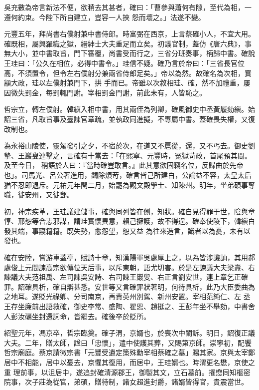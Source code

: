 \begin{pinyinscope}
 吳充數為帝言新法不便，欲稍去其甚者，確曰：「曹參與蕭何有隙，至代為相，一遵何約束。今陛下所自建立，豈容一人挾
 怨而壞之。」法遂不變。



 元豐五年，拜尚書右僕射兼中書侍郎。時富弼在西京，上言蔡確小人，不宜大用。確既相，屬興羅織之獄，縉紳士大夫重足而立矣。初議官制，蓋仿《唐六典》，事無大小，並中書取旨，門下審覆，尚書受而行之，三省分班奏事，柄歸中書。確說王珪曰：「公久在相位，必得中書令。」珪信不疑。確乃言於帝曰：「三省長官位高，不須置令，但令左右僕射分兼兩省侍郎足矣。」帝以為然。故確名為次相，實顓大政，珪以左僕射兼門下，拱
 手而已。帝雖以次敘相珪、確，然不加禮重，屢因微失罰金，每罰輒門謝。宰相罰金門謝，前此未有，人皆恥之。



 哲宗立，轉左僕射。韓縝入相中書，用其兩侄為列卿，確風御史中丞黃履劾縝。始詔三省，凡取旨事及臺諫官章疏，並執政同進擬，不專屬中書。蓋確畏失權，又復改制也。



 為永裕山陵使，靈駕發引之夕，不宿於次，在道又不扈從，還，又不丐去。御史劉摯、王巖叟連擊之，言確有十當去：「在熙寧、元豐時，冤獄苛政，首尾預其間。及至今日，
 稍語於人曰：『當時確豈敢言。』此其意欲固竊名位，反歸曲於先帝也」。司馬光、呂公著進用，蠲除煩苛，確言皆己所建白，公論益不容，太皇太后猶不忍即退斥。元祐元年閏二月，始罷為觀文殿學士、知陳州。明年，坐弟碩事奪職，徙安州，又徙鄧。



 初，神宗疾革，王珪議建儲事，確與同列皆在側，知狀。確自見得罪于世，陰與章惇、邢恕等合志邪謀，謂珪實懷異意，賴己擁護，故不得逞。確奉使陵下，韓縝白發其端，事寢籍籍。既失勢，愈怨望，恕又益
 為往來造言，識者以為憂，未有以發也。



 確在安陸，嘗游車蓋亭，賦詩十章，知漢陽軍吳處厚上之，以為皆涉譏訕，其用郝處俊上元間諫高宗欲傳位天后事，以斥東朝，語尤切害。於是左諫議大夫梁燾、右諫議大夫范祖禹、左司諫吳安詩、右司諫王巖叟、右正言劉安世，連上章乞正確罪。詔確具析，確自辯甚悉。安世等又言確罪狀著明，何待具析，此乃大臣委曲為之地耳。遂貶光祿卿、分司南京，再責英州別駕、新州安置。宰相范純仁、左
 丞王存坐廉前出語救確，御史李常、盛陶、翟恩、趙挺之、王彭年坐不舉劾，中書舍人彭汝礪坐封還詞命，皆罷去。確後卒於貶所。



 紹聖元年，馮京卒，哲宗臨奠。確子渭，京婿也，於喪次中闌訴。明日，詔復正議大夫。二年，贈太師，諡曰「忠懷」，遣中使護其葬，又賜第京師。崇寧初，配饗哲宗廟庭。蔡京請徽宗書「元豐受遺定策殊勳宰相蔡確之墓」賜其家。京與太宰鄭居中不相能，居中以憂去，京懼其復用，而居中，王珪婿也。時渭更名懋，京使之重
 理前事，以沮居中，遂追封確清源郡王，御製其文，立石墓前。擢懋同知樞密院事，次子莊為從官，弟碩，贈待制，諸女超進封爵，諸婿皆得官，貴震當世。




\end{pinyinscope}
